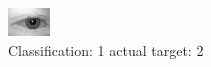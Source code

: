 \begin{figure}[h!]
\begin{center}
\includegraphics[width=0.60\columnwidth]{figures/ID461_class_1_target_2.png}
\end{center}
\caption{ Classification: 1 actual target: 2}
\label{fig:ID461_class_1_target_2}
\end{figure}

